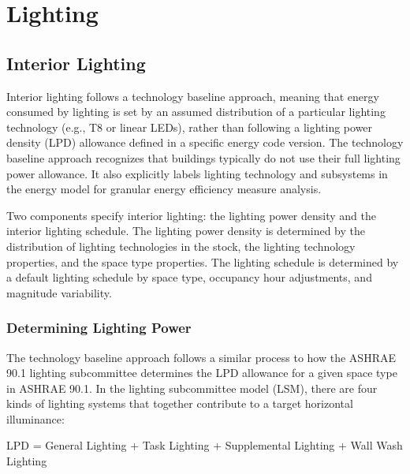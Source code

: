 \section{Lighting}
\subsection{Interior Lighting}
Interior lighting follows a technology baseline approach, meaning that energy consumed by lighting is set by an assumed distribution of a particular lighting technology (e.g., T8 or linear LEDs), rather than following a lighting power density (LPD) allowance defined in a specific energy code version. The technology baseline approach recognizes that buildings typically do not use their full lighting power allowance. It also explicitly labels lighting technology and subsystems in the energy model for granular energy efficiency measure analysis.

Two components specify interior lighting: the lighting power density and the interior lighting schedule.  The lighting power density is determined by the distribution of lighting technologies in the stock, the lighting technology properties, and the space type properties. The lighting schedule is determined by a default lighting schedule by space type, occupancy hour adjustments, and magnitude variability.

\subsubsection{Determining Lighting Power}
The technology baseline approach follows a similar process to how the ASHRAE 90.1 lighting subcommittee determines the LPD allowance for a given space type in ASHRAE 90.1. In the lighting subcommittee model (LSM), there are four kinds of lighting systems that together contribute to a target horizontal illuminance:

LPD = General Lighting + Task Lighting + Supplemental Lighting + Wall Wash Lighting \\

